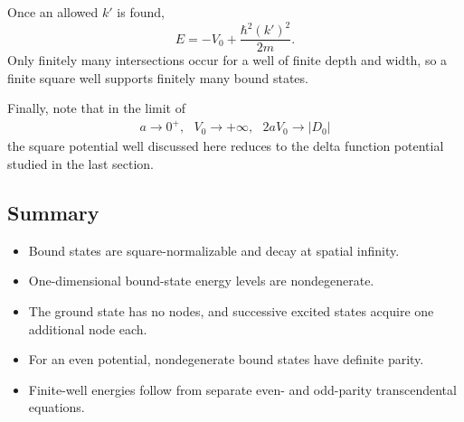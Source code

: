 Once an allowed $k'$ is found,
\begin{equation}
 E=-V_0+\frac{\hbar^2(k')^2}{2m}.
\end{equation}
Only finitely many intersections occur for a well of finite depth and width,
so a finite square well supports finitely many bound states.

Finally, note that in the limit of 
\begin{align}
    a\rightarrow0^+,~~~V_0\rightarrow+\infty,~~~2aV_0\rightarrow|D_0|
\end{align}
the square potential well discussed here reduces to the delta function potential studied in the last section. 

\subsection{Summary}
\begin{itemize}
 \item Bound states are square-normalizable and decay at spatial infinity.
 \item One-dimensional bound-state energy levels are nondegenerate.
 \item The ground state has no nodes, and successive excited states acquire
       one additional node each.
 \item For an even potential, nondegenerate bound states have definite parity.
 \item Finite-well energies follow from separate even- and odd-parity
       transcendental equations.
\end{itemize}

